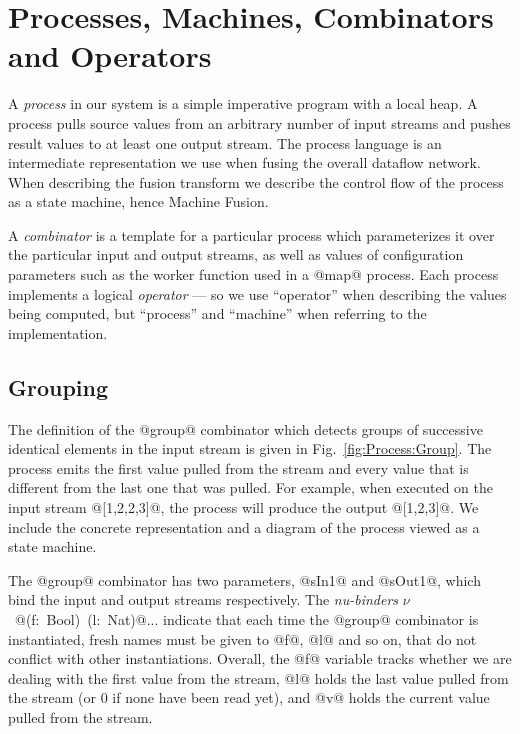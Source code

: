
\section{Processes, Machines, Combinators and Operators}
\label{s:Processes}

A \emph{process} in our system is a simple imperative program with a local heap. A process pulls source values from an arbitrary number of input streams and pushes result values to at least one output stream. The process language is an intermediate representation we use when fusing the overall dataflow network. When describing the fusion transform we describe the control flow of the process as a state machine, hence Machine Fusion. 

A \emph{combinator} is a template for a particular process which parameterizes it over the particular input and output streams, as well as values of configuration parameters such as the worker function used in a @map@ process. Each process implements a logical \emph{operator} --- so we use ``operator'' when describing the values being computed, but ``process'' and ``machine'' when referring to the implementation. 


\subsection{Grouping}

The definition of the @group@ combinator which detects groups of successive identical elements in the input stream is given in Fig.~\ref{fig:Process:Group}. The process emits the first value pulled from the stream and every value that is different from the last one that was pulled. For example, when executed on the input stream @[1,2,2,3]@, the process will produce the output @[1,2,3]@. We include the concrete representation and a diagram of the process viewed as a state machine.

The @group@ combinator has two parameters, @sIn1@ and @sOut1@, which bind the input and output streams respectively. The \emph{nu-binders} \mbox{$\nu$ @(f: Bool) (l: Nat)@...} indicate that each time the @group@ combinator is instantiated, fresh names must be given to @f@, @l@ and so on, that do not conflict with other instantiations. Overall, the @f@ variable tracks whether we are dealing with the first value from the stream, @l@ holds the last value pulled from the stream (or 0 if none have been read yet), and @v@ holds the current value pulled from the stream. 


